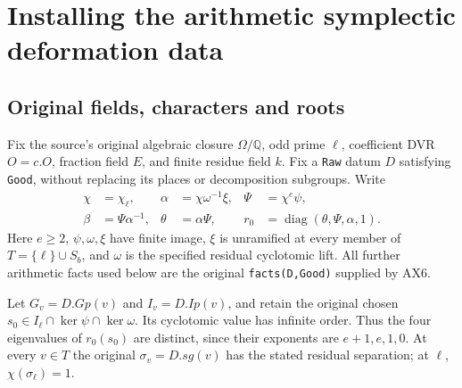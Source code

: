 \section{Installing the arithmetic symplectic deformation data}
\label{sec:symplectic-local-installation}


\subsection{Original fields, characters and roots}

Fix the source's original algebraic closure $\Omega/\mathbb Q$,
odd prime $\ell$, coefficient DVR $O=c.O$, fraction field $E$,
and finite residue field $k$.  Fix a \texttt{Raw} datum $D$
satisfying \texttt{Good}, without replacing its places or
decomposition subgroups.  Write
\[
 \begin{aligned}
 \chi&=\chi_\ell,&
 \alpha&=\chi\omega^{-1}\xi,&
 \Psi&=\chi^e\psi,\\
 \beta&=\Psi\alpha^{-1},&
 \theta&=\alpha\Psi,&
 r_0&=\operatorname{diag}(\theta,\Psi,\alpha,1).
 \end{aligned}
 \tag{DX.1}
\]
Here $e\ge2$, $\psi,\omega,\xi$ have finite image, $\xi$ is
unramified at every member of $T=\{\ell\}\cup S_b$, and
$\omega$ is the specified residual cyclotomic lift.
All further arithmetic facts used below are the original
\texttt{facts(D,Good)} supplied by AX6.

Let $G_v=D.Gp(v)$ and $I_v=D.Ip(v)$, and retain the original
chosen $s_0\in I_\ell\cap\ker\psi\cap\ker\omega$.
Its cyclotomic value has infinite order.  Thus the four eigenvalues
of $r_0(s_0)$ are distinct, since their exponents are
$e+1,e,1,0$.  At every $v\in T$ the original $\sigma_v=D.sg(v)$
has the stated residual separation; at $\ell$,
$\chi(\sigma_\ell)=1$.

